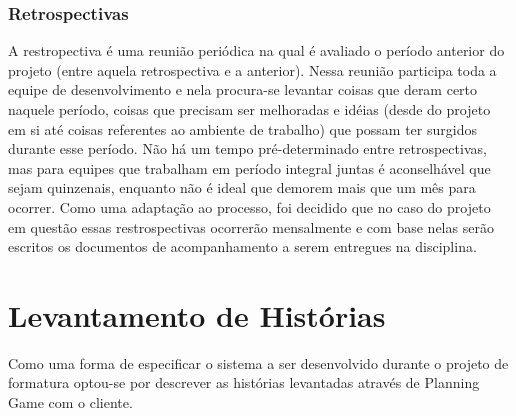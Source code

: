 \documentclass[a4paper,12pt,font=plain,header=plain]{abnt}
\begin{document}
      \subsubsection{Retrospectivas}
        A restropectiva é uma reunião periódica na qual é avaliado o período anterior do projeto (entre aquela retrospectiva e a anterior). Nessa reunião participa toda a equipe de desenvolvimento e nela procura-se levantar coisas que deram certo naquele período, coisas que precisam ser melhoradas e idéias (desde do projeto em si até coisas referentes ao ambiente de trabalho) que possam ter surgidos durante esse período. Não há um tempo pré-determinado entre retrospectivas, mas para equipes que trabalham em período integral juntas é aconselhável que sejam quinzenais, enquanto não é ideal que demorem mais que um mês para ocorrer. Como uma adaptação ao processo, foi decidido que no caso do projeto em questão essas restrospectivas ocorrerão mensalmente e com base nelas serão escritos os documentos de acompanhamento a serem entregues na disciplina.


  \section{Levantamento de Histórias}

	Como uma forma de especificar o sistema a ser desenvolvido durante o projeto de formatura optou-se por descrever as histórias levantadas através de Planning Game com o cliente.
\end{document}
